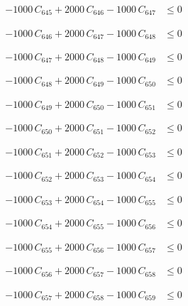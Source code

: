\documentclass[a4paper,11pt]{article}
\begin{document}
\begin{align}
-1000\,C_{645} + 2000\,C_{646} - 1000\,C_{647} &\leq 0 \nonumber
\end{align}

\begin{align}
-1000\,C_{646} + 2000\,C_{647} - 1000\,C_{648} &\leq 0 \nonumber
\end{align}

\begin{align}
-1000\,C_{647} + 2000\,C_{648} - 1000\,C_{649} &\leq 0 \nonumber
\end{align}

\begin{align}
-1000\,C_{648} + 2000\,C_{649} - 1000\,C_{650} &\leq 0 \nonumber
\end{align}

\begin{align}
-1000\,C_{649} + 2000\,C_{650} - 1000\,C_{651} &\leq 0 \nonumber
\end{align}

\begin{align}
-1000\,C_{650} + 2000\,C_{651} - 1000\,C_{652} &\leq 0 \nonumber
\end{align}

\begin{align}
-1000\,C_{651} + 2000\,C_{652} - 1000\,C_{653} &\leq 0 \nonumber
\end{align}

\begin{align}
-1000\,C_{652} + 2000\,C_{653} - 1000\,C_{654} &\leq 0 \nonumber
\end{align}

\begin{align}
-1000\,C_{653} + 2000\,C_{654} - 1000\,C_{655} &\leq 0 \nonumber
\end{align}

\begin{align}
-1000\,C_{654} + 2000\,C_{655} - 1000\,C_{656} &\leq 0 \nonumber
\end{align}

\begin{align}
-1000\,C_{655} + 2000\,C_{656} - 1000\,C_{657} &\leq 0 \nonumber
\end{align}

\begin{align}
-1000\,C_{656} + 2000\,C_{657} - 1000\,C_{658} &\leq 0 \nonumber
\end{align}

\begin{align}
-1000\,C_{657} + 2000\,C_{658} - 1000\,C_{659} &\leq 0 \nonumber
\end{align}
\end{document}

